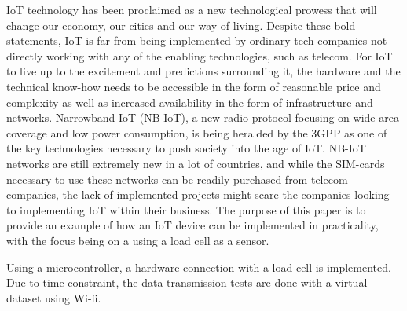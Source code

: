 IoT technology has been proclaimed as a new technological prowess that will change our economy, our cities and our way of living. Despite these bold statements, IoT is far from being implemented by
ordinary tech companies not directly working with any of the enabling technologies, such as telecom. For IoT to live up to the excitement and predictions surrounding it, the hardware and the technical know-how needs to be accessible in the form of reasonable price and complexity as well as increased availability in the form of infrastructure and networks. 
Narrowband-IoT (NB-IoT), a new radio protocol focusing on wide area coverage and low power consumption, is being heralded by the 3GPP as one of the key technologies necessary to push society into the age of IoT. NB-IoT networks are still extremely new in a lot of countries, and while the SIM-cards necessary to use these networks can be readily purchased from telecom companies, the lack of implemented projects might scare the companies looking to implementing IoT within their business. The purpose of this paper is to provide an example of how an IoT device can be implemented in practicality, with the focus being on a using a load cell as a sensor. 

Using a microcontroller, a hardware connection with a load cell is implemented. Due to time constraint, the data transmission tests are done with a virtual dataset using Wi-fi. 